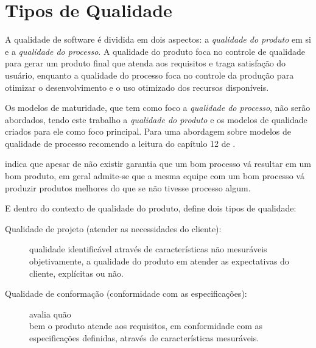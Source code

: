\documentclass[
	12pt,				%
	openright,			%
	oneside,			%
	a4paper,			%
	english,			%
	brazil,				%
	]{abntex2}
\begin{document}
\section{Tipos de Qualidade}

A qualidade de software é dividida em dois aspectos: a \emph{qualidade do produto} em si e a \emph{qualidade do processo}. A qualidade do produto foca no controle de qualidade para gerar um produto final que atenda aos requisitos e traga satisfação do usuário, enquanto a qualidade do processo foca no controle da produção para otimizar o desenvolvimento e o uso otimizado dos recursos disponíveis.

Os modelos de maturidade, que tem como foco a \emph{qualidade do processo}, não serão abordados, tendo este trabalho a \emph{qualidade do produto} e os modelos de qualidade criados para ele como foco principal. Para uma abordagem sobre modelos de qualidade de processo recomendo a leitura do capítulo 12 de .

 indica que apesar de não existir garantia que um bom processo vá resultar em um bom produto, em geral admite-se que a mesma equipe com um bom processo vá produzir produtos melhores do que se não tivesse processo algum.



E dentro do contexto de qualidade do produto,  define dois tipos de qualidade:

\begin{description}
    \item [Qualidade de projeto (atender as necessidades do cliente):] qualidade identificável através de características não mesuráveis objetivamente, a qualidade do produto em atender as expectativas do cliente, explícitas ou não.
    \item [Qualidade de conformação (conformidade com as especificações):] avalia quão \\ bem o produto atende aos requisitos, em conformidade com as especificações definidas, através de características mesuráveis.
\end{description}
\end{document}
